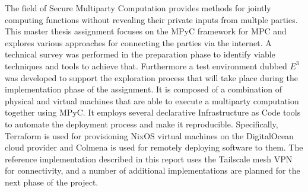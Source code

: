 The field of Secure Multiparty Computation provides methods for jointly
computing functions without revealing their private inputs from multple
parties. This master thesis assignment focuses on the MPyC framework for
MPC and explores various approaches for connecting the parties via the
internet. A technical survey was performed in the preparation phase to
identify viable techniques and tools to achieve that. Furthermore a test
environment dubbed \(E^3\) was developed to support the exploration
process that will take place during the implementation phase of the
assignment. It is composed of a combination of physical and virtual
machines that are able to execute a multiparty computation together
using MPyC. It employs several declarative Infrastructure as Code tools
to automate the deployment process and make it reproducible.
Specifically, Terraform is used for provisioning NixOS virtual machines
on the DigitalOcean cloud provider and Colmena is used for remotely
deploying software to them. The reference implementation described in
this report uses the Tailscale mesh VPN for connectivity, and a number
of additional implementations are planned for the next phase of the
project.
